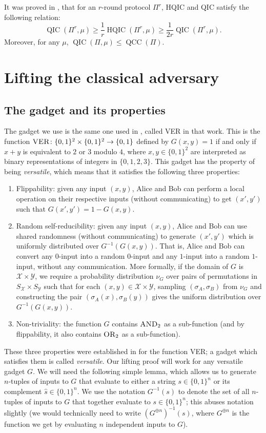 \documentclass[10pt,a4paper]{article}
\theoremstyle{definition}
\newcommand{\B}{\{0,1\}}
\newcommand{\X}{\mathcal{X}}
\newcommand{\Y}{\mathcal{Y}}
\renewcommand{\>}{\rangle}
\newcommand{\<}{\langle}
\newcommand{\OR}{\textsc{OR}}
\newcommand{\AND}{\textsc{AND}}
\DeclareMathOperator{\QCC}{QCC}
\DeclareMathOperator{\QIC}{QIC}
\DeclareMathOperator{\HQIC}{HQIC}
\begin{document}
It was proved in \cite{LT17}, that for an $r$-round protocol $\Pi^r$, HQIC and QIC satisfy the following relation:
\[ \QIC(\Pi^r, \mu) \geq \frac{1}{r}\HQIC(\Pi^r, \mu) \geq \frac{1}{2r}\QIC(\Pi^r,\mu).\]
Moreover, for any $\mu$, $\QIC(\Pi,\mu) \leq \QCC(\Pi)$.


\section{Lifting the classical adversary}

\subsection{The gadget and its properties}

The gadget we use is the same one used in \cite{GP18},
called \textsc{VER} in that work. This is the function
$\textsc{VER}\colon\B^2\times\B^2\to\B$ defined by $G(x,y)=1$
if and only if $x+y$ is equivalent to $2$ or $3$ modulo $4$,
where $x,y\in\B^2$ are interpreted as binary representations
of integers in $\{0,1,2,3\}$. This gadget has the property
of being \emph{versatile}, which means that it satisfies
the following three properties:
\begin{enumerate}
\item Flippability: given any input $(x,y)$, Alice
and Bob can perform a local operation on their respective inputs (without communicating)
to get $(x',y')$ such that $G(x',y')=1-G(x,y)$.
\item Random self-reducibility: given any input $(x,y)$,
Alice and Bob can use shared randomness (without communicating)
to generate $(x',y')$ which is uniformly distributed over
$G^{-1}(G(x,y))$. That is, Alice and Bob can convert any $0$-input
into a random $0$-input and any $1$-input into a random $1$-input,
without any communication. More formally,
if the domain of $G$ is $\X\times \Y$,
we require a probability distribution $\nu_G$
over pairs of permutations in $S_{\X}\times S_{\Y}$
such that for each $(x,y)\in\X\times\Y$,
sampling $(\sigma_A,\sigma_B)$ from $\nu_G$
and constructing the pair $(\sigma_A(x),\sigma_B(y))$
gives the uniform distribution over $G^{-1}(G(x,y))$.
\item Non-triviality: the function $G$ contains $\AND_2$
as a sub-function (and by flippability, it also contains
$\OR_2$ as a sub-function).
\end{enumerate}

These three properties were established in \cite{GP18} for
the function \textsc{VER}; a gadget which satisfies
them is called \emph{versatile}.
Our lifting proof will work for any versatile gadget $G$.
We will need the following simple lemma, which allows
us to generate $n$-tuples of inputs to $G$ that evaluate
to either a string $s\in\B^n$ or its complement
$\hat{s}\in\B^n$. We use the notation $G^{-1}(s)$
to denote the set of all $n$-tuples of inputs to $G$
that together evaluate to $s\in\B^n$; this abuses
notation slightly (we would technically need to write
$(G^{\oplus n})^{-1}(s)$, where $G^{\oplus n}$ is
the function we get by evaluating $n$ independent inputs
to $G$).
\end{document}
